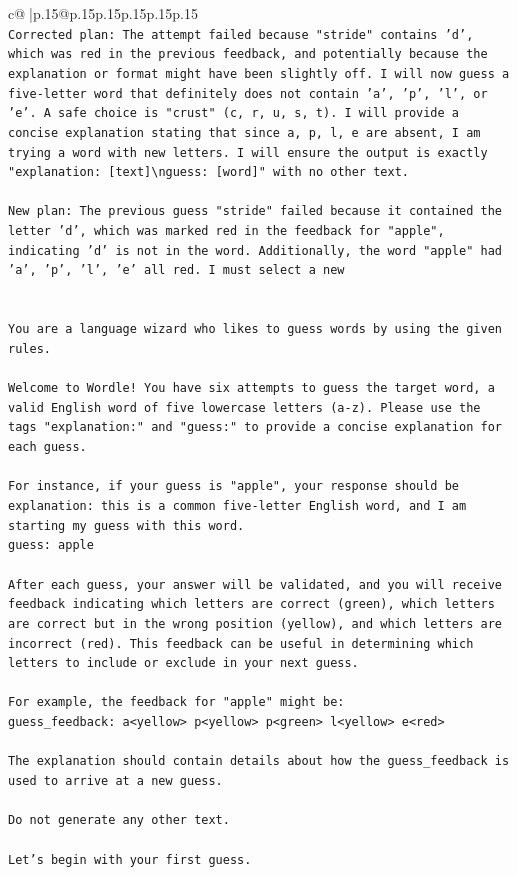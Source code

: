 \documentclass{article}
\begin{document}
{\begin{supertabular}{c@{$\;$}|p{.15\linewidth}@{}p{.15\linewidth}p{.15\linewidth}p{.15\linewidth}p{.15\linewidth}p{.15\linewidth}}
{{{\\ 
\texttt{Corrected plan: The attempt failed because "stride" contains 'd', which was red in the previous feedback, and potentially because the explanation or format might have been slightly off. I will now guess a five{-}letter word that definitely does not contain 'a', 'p', 'l', or 'e'. A safe choice is "crust" (c, r, u, s, t). I will provide a concise explanation stating that since a, p, l, e are absent, I am trying a word with new letters. I will ensure the output is exactly "explanation: {[}text{]}\textbackslash{}nguess: {[}word{]}" with no other text.} \\
\\ 
\texttt{New plan: The previous guess "stride" failed because it contained the letter 'd', which was marked red in the feedback for "apple", indicating 'd' is not in the word. Additionally, the word "apple" had 'a', 'p', 'l', 'e' all red. I must select a new} \\
\\ 
\\ 
\texttt{You are a language wizard who likes to guess words by using the given rules.} \\
\\ 
\texttt{Welcome to Wordle! You have six attempts to guess the target word, a valid English word of five lowercase letters (a{-}z). Please use the tags "explanation:" and "guess:" to provide a concise explanation for each guess.} \\
\\ 
\texttt{For instance, if your guess is "apple", your response should be} \\
\texttt{explanation: this is a common five{-}letter English word, and I am starting my guess with this word.} \\
\texttt{guess: apple} \\
\\ 
\texttt{After each guess, your answer will be validated, and you will receive feedback indicating which letters are correct (green), which letters are correct but in the wrong position (yellow), and which letters are incorrect (red). This feedback can be useful in determining which letters to include or exclude in your next guess.} \\
\\ 
\texttt{For example, the feedback for "apple" might be:} \\
\texttt{guess\_feedback: a<yellow> p<yellow> p<green> l<yellow> e<red>} \\
\\ 
\texttt{The explanation should contain details about how the guess\_feedback is used to arrive at a new guess.} \\
\\ 
\texttt{Do not generate any other text.} \\
\\ 
\texttt{Let's begin with your first guess.} \\
            }
        }
    }
     \\ \\


\end{supertabular}}
\end{document}
